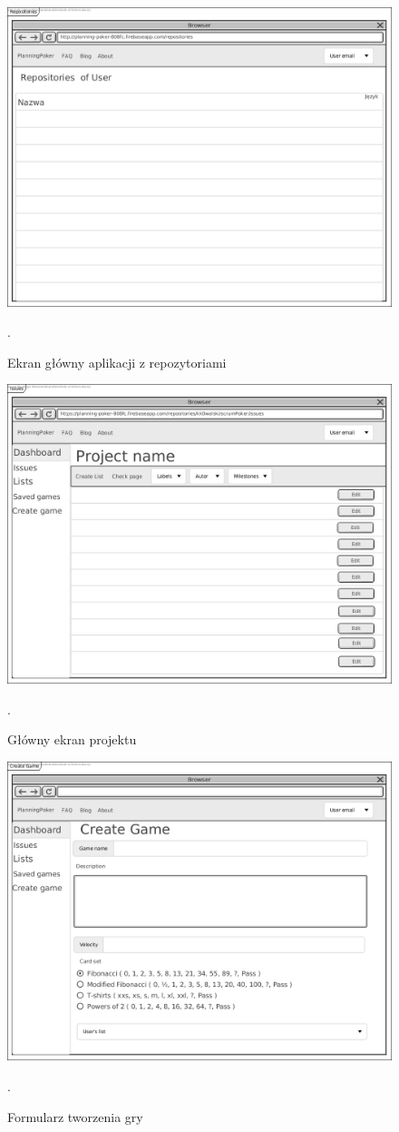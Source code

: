 \begin{figure}[H]
	\centering\includegraphics[width=.7\textwidth]{img/RepositoriesScreen}
	\caption{Ekran główny aplikacji z repozytoriami}.
	\label{rys:RepositoriesScreen}
\end{figure}

\begin{figure}[H]
	\centering\includegraphics[width=.7\textwidth]{img/IssuesScreen}
	\caption{Główny ekran projektu}.
	\label{rys:IssuesScreen}
\end{figure}

\begin{figure}[H]
	\centering\includegraphics[width=.7\textwidth]{img/gameCreate}
	\caption{Formularz tworzenia gry}.
	\label{rys:gameCreate}
\end{figure}

